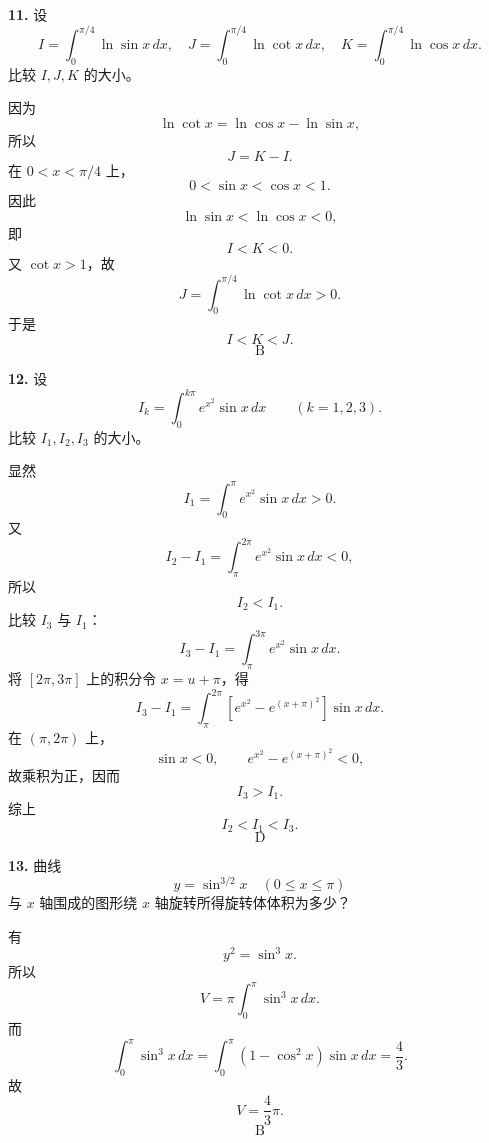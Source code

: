 \begin{problemblock}
\textbf{11.} 设
\[
I=\int_0^{\pi/4}\ln\sin x\,dx,\quad
J=\int_0^{\pi/4}\ln\cot x\,dx,\quad
K=\int_0^{\pi/4}\ln\cos x\,dx.
\]
比较 \(I,J,K\) 的大小。
\end{problemblock}

\begin{solutionblock}
因为
\[
\ln\cot x=\ln\cos x-\ln\sin x,
\]
所以
\[
J=K-I.
\]
在 \(0<x<\pi/4\) 上，
\[
0<\sin x<\cos x<1.
\]
因此
\[
\ln\sin x<\ln\cos x<0,
\]
即
\[
I<K<0.
\]
又 \(\cot x>1\)，故
\[
J=\int_0^{\pi/4}\ln\cot x\,dx>0.
\]
于是
\[
I<K<J.
\]
\[
\boxed{\text{B}}
\]
\end{solutionblock}

\begin{problemblock}
\textbf{12.} 设
\[
I_k=\int_0^{k\pi}e^{x^2}\sin x\,dx\qquad(k=1,2,3).
\]
比较 \(I_1,I_2,I_3\) 的大小。
\end{problemblock}

\begin{solutionblock}
显然
\[
I_1=\int_0^\pi e^{x^2}\sin x\,dx>0.
\]
又
\[
I_2-I_1=\int_\pi^{2\pi}e^{x^2}\sin x\,dx<0,
\]
所以
\[
I_2<I_1.
\]
比较 \(I_3\) 与 \(I_1\)：
\[
I_3-I_1=\int_\pi^{3\pi}e^{x^2}\sin x\,dx.
\]
将 \([2\pi,3\pi]\) 上的积分令 \(x=u+\pi\)，得
\[
I_3-I_1
=\int_\pi^{2\pi}\left[e^{x^2}-e^{(x+\pi)^2}\right]\sin x\,dx.
\]
在 \((\pi,2\pi)\) 上，
\[
\sin x<0,\qquad e^{x^2}-e^{(x+\pi)^2}<0,
\]
故乘积为正，因而
\[
I_3>I_1.
\]
综上
\[
I_2<I_1<I_3.
\]
\[
\boxed{\text{D}}
\]
\end{solutionblock}

\begin{problemblock}
\textbf{13.} 曲线
\[
y=\sin^{3/2}x\quad(0\le x\le\pi)
\]
与 \(x\) 轴围成的图形绕 \(x\) 轴旋转所得旋转体体积为多少？
\end{problemblock}

\begin{solutionblock}
有
\[
y^2=\sin^3x.
\]
所以
\[
V=\pi\int_0^\pi \sin^3x\,dx.
\]
而
\[
\int_0^\pi\sin^3x\,dx
=\int_0^\pi(1-\cos^2x)\sin x\,dx
=\frac43.
\]
故
\[
V=\frac43\pi.
\]
\[
\boxed{\text{B}}
\]
\end{solutionblock}

